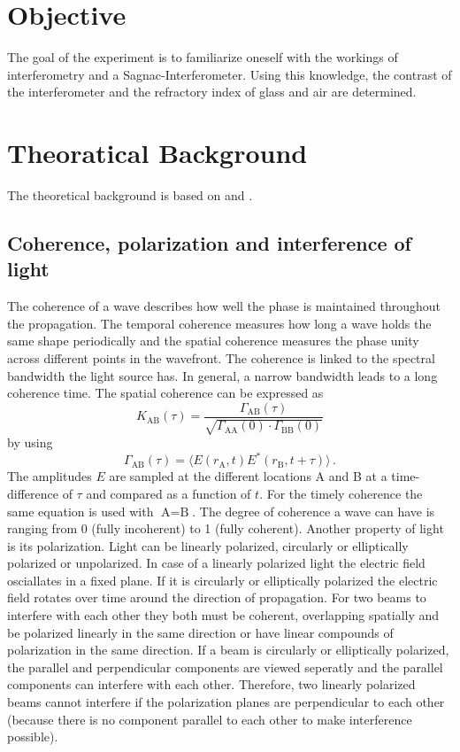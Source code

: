 \section{Objective}
\label{sec:Objective}
The goal of the experiment is to familiarize oneself with the workings of interferometry and a Sagnac-Interferometer. 
Using this knowledge, the contrast of the interferometer and the refractory index of glass and air are determined. 

\section{Theoratical Background}
\label{sec:Theorie}
The theoretical background is based on \cite{Optik} and \cite{anleitungV64}.
\subsection{Coherence, polarization and interference of light}
The coherence of a wave describes how well the phase is maintained throughout the propagation. The temporal coherence measures how long a 
wave holds the same shape periodically and the spatial coherence measures the phase unity across different points in the wavefront.
The coherence is linked to the spectral bandwidth the light source has. In general, a narrow bandwidth leads to a long coherence time.
 The spatial coherence can be expressed as 
\begin{equation*}
   K_{\text{AB}} (\tau) =  \frac{\Gamma_{\text{AB}}(\tau)}{\sqrt{\Gamma_{\text{AA}}(0) \cdot \Gamma_{\text{BB}}(0)}} 
\end{equation*}
by using
\begin{equation*}
   \Gamma_{\text{AB}}(\tau) = \langle E(r_{\text{A}},t)E^{*}(r_{\text{B}},t + \tau) \rangle \, .
\end{equation*}
The amplitudes $E$ are sampled at the different locations A and B at a time-difference of $\tau$ and compared as a function of $t$. For the timely coherence the same equation is used with $\text{A} = \text{B}$.
The degree of coherence a wave can have is ranging from 0 (fully incoherent) to 1 (fully coherent).
Another property of light is its polarization. Light can be linearly polarized, circularly or elliptically polarized or unpolarized. 
In case of a linearly polarized light the electric field osciallates in a fixed plane. If it is circularly or elliptically polarized the 
electric field rotates over time around the direction of propagation. 
For two beams to interfere with each other they both must be coherent, overlapping spatially and be polarized linearly in the same direction or have
linear compounds of polarization in the same direction. If a beam is circularly or elliptically polarized, the parallel and perpendicular components are viewed seperatly and the parallel components can interfere with each other. Therefore, two linearly polarized beams cannot interfere if the polarization planes are perpendicular to each other (because there is no component parallel to each other to make interference possible). 

